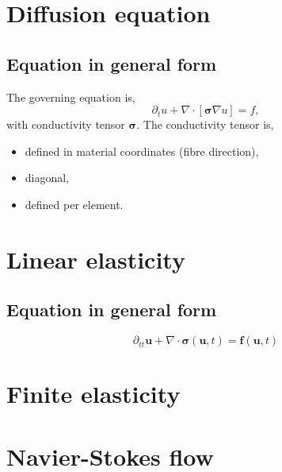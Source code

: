 \documentclass[
10pt, %
a4paper, %
oneside, %
headinclude,footinclude, %
BCOR5mm, %
]{scrartcl}
\begin{document}
\section{Diffusion equation}
%
\subsection{Equation in general form}
%
The governing equation is,
%
\begin{equation}
    \partial_t u + \nabla \cdot [\boldsymbol{\sigma} \nabla u] = f,
\end{equation}
%
with conductivity tensor $\boldsymbol{\sigma}$. The conductivity tensor is,
%
\begin{itemize}
    \item{defined in material coordinates (fibre direction),}
    \item{diagonal,}
    \item{defined per element.}
\end{itemize}
%

%

%

%
%
%

%
%
\clearpage
%
\section{Linear elasticity}
%
\subsection{Equation in general form}
%
\begin{equation}
    \partial_{tt} \boldsymbol{u} + \nabla \cdot \boldsymbol{\sigma} (\boldsymbol{u}, t) = \boldsymbol{f} (\boldsymbol{u}, t)
\end{equation}
%

%
%
\clearpage
%
\section{Finite elasticity}
%
%
%
%
\clearpage
%
\section{Navier-Stokes flow}
%
%
%
%
\clearpage
%
\end{document}
